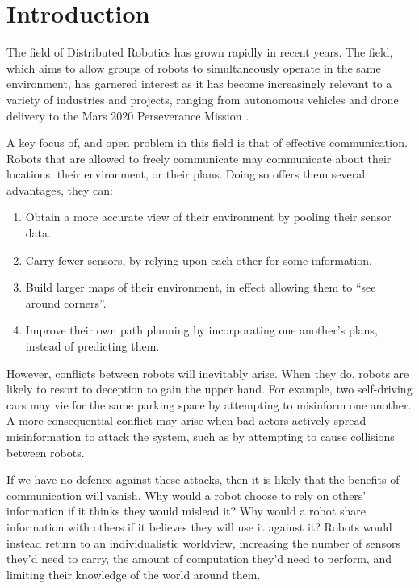 \chapter{Introduction}

The field of Distributed Robotics has grown rapidly in recent years. The field, which aims to allow groups of robots to simultaneously operate in the same environment, has garnered interest as it has become increasingly relevant to a variety of industries and projects, ranging from autonomous vehicles \cite{intro1-car} and drone delivery \cite{intro2-drone} to the Mars 2020 Perseverance Mission \cite{intro3-mars}.

A key focus of, and open problem in this field is that of effective communication. Robots that are allowed to freely communicate may communicate about their locations, their environment, or their plans. Doing so offers them several advantages, they can:
\begin{enumerate}
    \item Obtain a more accurate view of their environment by pooling their sensor data.
    \item Carry fewer sensors, by relying upon each other for some information.
    \item Build larger maps of their environment, in effect allowing them to ``see around corners''.
    \item Improve their own path planning by incorporating one another's plans, instead of predicting them.
\end{enumerate}

However, conflicts between robots will inevitably arise. When they do, robots are likely to resort to deception to gain the upper hand. For example, two self-driving cars may vie for the same parking space by attempting to misinform one another. A more consequential conflict may arise when bad actors actively spread misinformation to attack the system, such as by attempting to cause collisions between robots. 

If we have no defence against these attacks, then it is likely that the benefits of communication will vanish. Why would a robot choose to rely on others' information if it thinks they would mislead it? Why would a robot share information with others if it believes they will use it against it? Robots would instead return to an individualistic worldview, increasing the number of sensors they'd need to carry, the amount of computation they'd need to perform, and limiting their knowledge of the world around them.


